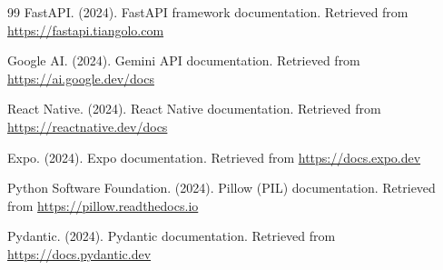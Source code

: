\begin{thebibliography}{99}
FastAPI. (2024).
FastAPI framework documentation.
Retrieved from \url{https://fastapi.tiangolo.com}

Google AI. (2024).
Gemini API documentation.
Retrieved from \url{https://ai.google.dev/docs}

React Native. (2024).
React Native documentation.
Retrieved from \url{https://reactnative.dev/docs}

Expo. (2024).
Expo documentation.
Retrieved from \url{https://docs.expo.dev}

Python Software Foundation. (2024).
Pillow (PIL) documentation.
Retrieved from \url{https://pillow.readthedocs.io}

Pydantic. (2024).
Pydantic documentation.
Retrieved from \url{https://docs.pydantic.dev}

\end{thebibliography}